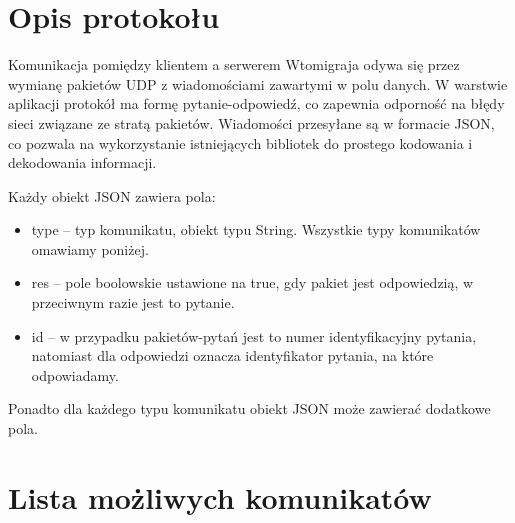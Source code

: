 \documentclass[a4paper, 10pt]{article}
\begin{document}
\tableofcontents

\newpage
\section{Opis protokołu}
Komunikacja pomiędzy klientem a serwerem Wtomigraja odywa się przez wymianę pakietów UDP z wiadomościami zawartymi w polu danych. W warstwie aplikacji protokół ma formę pytanie-odpowiedź, co zapewnia odporność na błędy sieci związane ze stratą pakietów. Wiadomości przesyłane są w formacie JSON, co pozwala na wykorzystanie istniejących bibliotek do prostego kodowania i dekodowania informacji.

Każdy obiekt JSON zawiera pola:
\begin{itemize}
 \item type -- typ komunikatu, obiekt typu String. Wszystkie typy komunikatów omawiamy poniżej.
 \item res -- pole boolowskie ustawione na true, gdy pakiet jest odpowiedzią, w przeciwnym razie jest to pytanie.
 \item id -- w przypadku pakietów-pytań jest to numer identyfikacyjny pytania, natomiast dla odpowiedzi oznacza identyfikator pytania, na które odpowiadamy.
\end{itemize}
Ponadto dla każdego typu komunikatu obiekt JSON może zawierać dodatkowe pola.

\section{Lista możliwych komunikatów}
\end{document}
